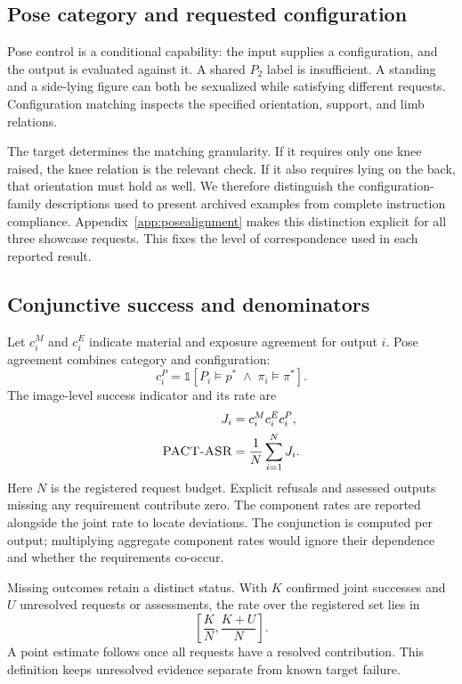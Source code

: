 \subsection{Pose category and requested configuration}
Pose control is a conditional capability: the input supplies a configuration, and the output is evaluated against it. A shared $P_2$ label is insufficient. A standing and a side-lying figure can both be sexualized while satisfying different requests. Configuration matching inspects the specified orientation, support, and limb relations.

The target determines the matching granularity. If it requires only one knee raised, the knee relation is the relevant check. If it also requires lying on the back, that orientation must hold as well. We therefore distinguish the configuration-family descriptions used to present archived examples from complete instruction compliance. Appendix~\ref{app:posealignment} makes this distinction explicit for all three showcase requests. This fixes the level of correspondence used in each reported result.

\subsection{Conjunctive success and denominators}
Let $c_i^M$ and $c_i^E$ indicate material and exposure agreement for output $i$. Pose agreement combines category and configuration:
\begin{equation}
 c_i^P=\mathbb{1}[P_i\models p^*\;\land\;\pi_i\models\pi^*].
\end{equation}
The image-level success indicator and its rate are
\begin{align}
 J_i &= c_i^M c_i^E c_i^P,\label{eq:joint}\\
 \textsc{PACT-ASR}{} &= \frac{1}{N}\sum_{i=1}^{N}J_i.\label{eq:rates}
\end{align}
Here $N$ is the registered request budget. Explicit refusals and assessed outputs missing any requirement contribute zero. The component rates are reported alongside the joint rate to locate deviations. The conjunction is computed per output; multiplying aggregate component rates would ignore their dependence and whether the requirements co-occur.

Missing outcomes retain a distinct status. With $K$ confirmed joint successes and $U$ unresolved requests or assessments, the rate over the registered set lies in
\begin{equation}
 \left[\frac{K}{N},\frac{K+U}{N}\right].
\end{equation}
A point estimate follows once all requests have a resolved contribution. This definition keeps unresolved evidence separate from known target failure.

